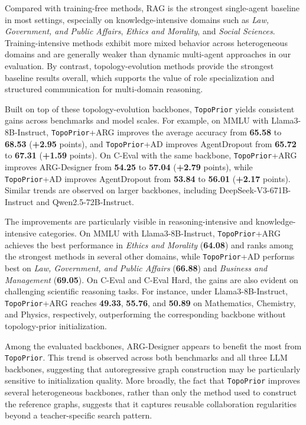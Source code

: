 \documentclass[lettersize,journal]{IEEEtran}
\theoremstyle{plain}
\begin{document}
Compared with training-free methods, RAG is the strongest single-agent baseline in most settings, especially on knowledge-intensive domains such as \emph{Law, Government, and Public Affairs}, \emph{Ethics and Morality}, and \emph{Social Sciences}. Training-intensive methods exhibit more mixed behavior across heterogeneous domains and are generally weaker than dynamic multi-agent approaches in our evaluation. By contrast, topology-evolution methods provide the strongest baseline results overall, which supports the value of role specialization and structured communication for multi-domain reasoning.

Built on top of these topology-evolution backbones, \texttt{TopoPrior} yields consistent gains across benchmarks and model scales. For example, on MMLU with Llama3-8B-Instruct, \texttt{TopoPrior}+ARG improves the average accuracy from \textbf{65.58} to \textbf{68.53} (\textbf{+2.95} points), and \texttt{TopoPrior}+AD improves AgentDropout from \textbf{65.72} to \textbf{67.31} (\textbf{+1.59} points). On C-Eval with the same backbone, \texttt{TopoPrior}+ARG improves ARG-Designer from \textbf{54.25} to \textbf{57.04} (\textbf{+2.79} points), while \texttt{TopoPrior}+AD improves AgentDropout from \textbf{53.84} to \textbf{56.01} (\textbf{+2.17} points). Similar trends are observed on larger backbones, including DeepSeek-V3-671B-Instruct and Qwen2.5-72B-Instruct.

The improvements are particularly visible in reasoning-intensive and knowledge-intensive categories. On MMLU with Llama3-8B-Instruct, \texttt{TopoPrior}+ARG achieves the best performance in \emph{Ethics and Morality} (\textbf{64.08}) and ranks among the strongest methods in several other domains, while \texttt{TopoPrior}+AD performs best on \emph{Law, Government, and Public Affairs} (\textbf{66.88}) and \emph{Business and Management} (\textbf{69.05}). On C-Eval and C-Eval Hard, the gains are also evident on challenging scientific reasoning tasks. For instance, under Llama3-8B-Instruct, \texttt{TopoPrior}+ARG reaches \textbf{49.33}, \textbf{55.76}, and \textbf{50.89} on Mathematics, Chemistry, and Physics, respectively, outperforming the corresponding backbone without topology-prior initialization.

Among the evaluated backbones, ARG-Designer appears to benefit the most from \texttt{TopoPrior}. This trend is observed across both benchmarks and all three LLM backbones, suggesting that autoregressive graph construction may be particularly sensitive to initialization quality. More broadly, the fact that \texttt{TopoPrior} improves several heterogeneous backbones, rather than only the method used to construct the reference graphs, suggests that it captures reusable collaboration regularities beyond a teacher-specific search pattern.
\end{document}

